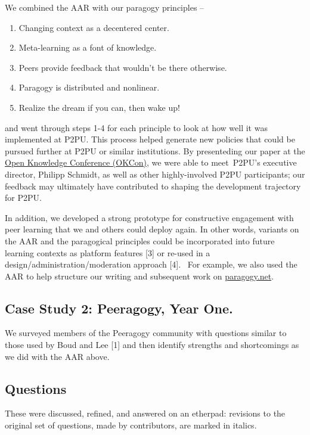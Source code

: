 We combined the AAR with our paragogy principles --
\begin{enumerate} \label{paragogy-principles}
\itemsep1pt\parskip0pt
\item Changing context as a decentered center.
\item Meta-learning as a font of knowledge.
\item Peers provide feedback that wouldn’t be there otherwise.
\item Paragogy is distributed and nonlinear.
\item Realize the dream if you can, then wake up!
\end{enumerate}
and went through steps 1-4 for each principle to look at how well it
was implemented at P2PU. This process helped generate new policies
that could be pursued further at P2PU or similar institutions.  By
presenteding our paper at the \href{http://okfn.org/okcon/}{Open
  Knowledge Conference (OKCon)}, we were able to meet~P2PU's executive
director, Philipp Schmidt, as well as other highly-involved P2PU
participants; our feedback may ultimately have contributed to shaping
the development trajectory for P2PU.

In addition, we developed a strong prototype for constructive engagement
with peer learning that we and others could deploy again. In other
words, variants on the AAR and the paragogical principles could be
incorporated into future learning contexts as platform features {[}3{]}
or re-used in a design/administration/moderation approach {[}4{]}.~ For
example, we also used the AAR to help structure our writing and
subsequent work on \href{http://paragogy.net}{paragogy.net}.

\subsection{Case Study 2: Peeragogy, Year One.}

We surveyed members of the Peeragogy community with questions similar
to those used by Boud and Lee {[}1{]} and then identify strengths and
shortcomings as we did with the AAR above. 

\subsection{Questions}

These were discussed, refined, and answered on an etherpad: revisions
to the original set of questions, made by contributors, are marked in
italics.

